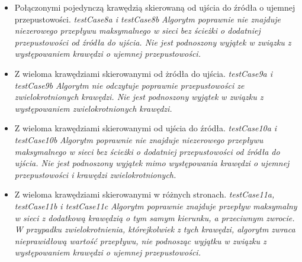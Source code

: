 \begin{itemize}[nosep]
    \item Połączonymi pojedynczą krawędzią skierowaną od ujścia do źródła o ujemnej przepustowości.
    \emph{testCase8a i testCase8b}
    \emph{Algorytm poprawnie nie znajduje
    niezerowego przepływu maksymalnego w sieci bez ścieżki o dodatniej
    przepustowości od źródła do ujścia. Nie jest podnoszony wyjątek
    w związku z występowaniem krawędzi o ujemnej przepustowości.}

    \item Z wieloma krawędziami skierowanymi od żródła do ujścia.
    \emph{testCase9a i testCase9b}
    \emph{Algorytm nie odczytuje
    poprawnie przepustowości ze zwielokrotnionych krawędzi. Nie jest
    podnoszony wyjątek w związku z występowaniem zwielokrotnionych krawędzi.}

    \item Z wieloma krawędziami skierowanymi od ujścia do źródła.
    \emph{testCase10a i testCase10b}
    \emph{Algorytm poprawnie
    nie znajduje niezerowego przepływu maksymalnego w sieci bez ścieżki
    o dodatniej przepustowości od źródła do ujścia. Nie jest podnoszony
    wyjątek mimo występowania krawędzi o ujemnej przepustowości i krawędzi
    zwielokrotnionych.}

    \item Z wieloma krawędziami skierowanymi w różnych stronach.
    \emph{testCase11a, testCase11b i testCase11c}
    \emph{Algorytm poprawnie znajduje przepływ maksymalny w sieci z dodatkową krawędzią
    o tym samym kierunku, a przeciwnym zwrocie. W przypadku zwielokrotnienia,
    którejkolwiek z tych krawędzi, algorytm zwraca nieprawidłową wartość
    przepływu, nie podnosząc wyjątku w związku z występowaniem krawędzi
    o ujemnej przepustowości.}

\end{itemize}



